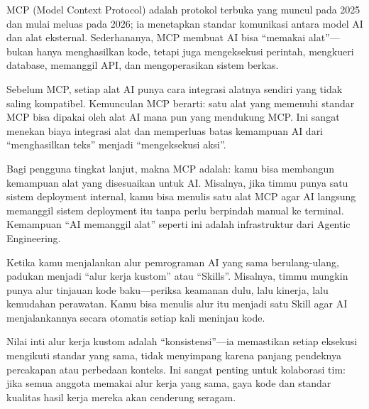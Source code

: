 


MCP (Model Context Protocol) adalah protokol terbuka yang muncul pada 2025 dan mulai meluas pada 2026; ia menetapkan standar komunikasi antara model AI dan alat eksternal. Sederhananya, MCP membuat AI bisa “memakai alat”—bukan hanya menghasilkan kode, tetapi juga mengeksekusi perintah, mengkueri database, memanggil API, dan mengoperasikan sistem berkas.

Sebelum MCP, setiap alat AI punya cara integrasi alatnya sendiri yang tidak saling kompatibel. Kemunculan MCP berarti: satu alat yang memenuhi standar MCP bisa dipakai oleh alat AI mana pun yang mendukung MCP. Ini sangat menekan biaya integrasi alat dan memperluas batas kemampuan AI dari “menghasilkan teks” menjadi “mengeksekusi aksi”.

Bagi pengguna tingkat lanjut, makna MCP adalah: kamu bisa membangun kemampuan alat yang disesuaikan untuk AI. Misalnya, jika timmu punya satu sistem deployment internal, kamu bisa menulis satu alat MCP agar AI langsung memanggil sistem deployment itu tanpa perlu berpindah manual ke terminal. Kemampuan “AI memanggil alat” seperti ini adalah infrastruktur dari Agentic Engineering.


Ketika kamu menjalankan alur pemrograman AI yang sama berulang-ulang, padukan menjadi “alur kerja kustom” atau “Skills”. Misalnya, timmu mungkin punya alur tinjauan kode baku—periksa keamanan dulu, lalu kinerja, lalu kemudahan perawatan. Kamu bisa menulis alur itu menjadi satu Skill agar AI menjalankannya secara otomatis setiap kali meninjau kode.

Nilai inti alur kerja kustom adalah “konsistensi”—ia memastikan setiap eksekusi mengikuti standar yang sama, tidak menyimpang karena panjang pendeknya percakapan atau perbedaan konteks. Ini sangat penting untuk kolaborasi tim: jika semua anggota memakai alur kerja yang sama, gaya kode dan standar kualitas hasil kerja mereka akan cenderung seragam.

